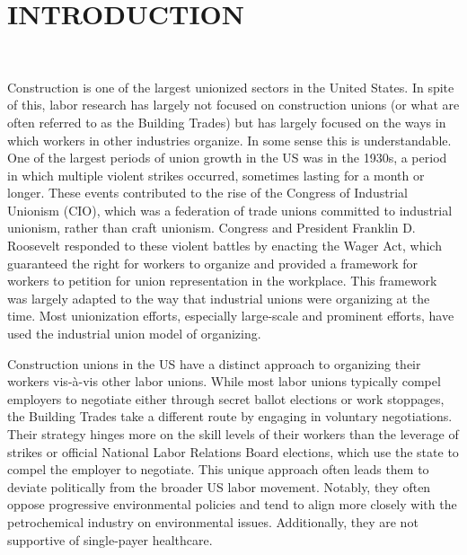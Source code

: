 \documentclass[12pt]{article}
\begin{document}
\tableofcontents
\newpage


\section{INTRODUCTION} \

Construction is one of the largest unionized sectors in the United States. In spite of this, labor research has largely not focused on construction unions (or what are often referred to as the Building Trades) but has largely focused on the ways in which workers in other industries organize. In some sense this is understandable. One of the largest periods of union growth in the US was in the 1930s, a period in which multiple violent strikes occurred, sometimes lasting for a month or longer. These events contributed to the rise of the Congress of Industrial Unionism (CIO), which was a federation of trade unions committed to industrial unionism, rather than craft unionism. Congress and President Franklin D. Roosevelt responded to these violent battles by enacting the Wager Act, which guaranteed the right for workers to organize and provided a framework for workers to petition for union representation in the workplace. This framework was largely adapted to the way that industrial unions were organizing at the time. Most unionization efforts, especially large-scale and prominent efforts, have used the industrial union model of organizing.


Construction unions in the US have a distinct approach to organizing their workers vis-à-vis other labor unions. While most labor unions typically compel employers to negotiate either through secret ballot elections or work stoppages, the Building Trades take a different route by engaging in voluntary negotiations. Their strategy hinges more on the skill levels of their workers than the leverage of strikes or official National Labor Relations Board elections, which use the state to compel the employer to negotiate. This unique approach often leads them to deviate politically from the broader US labor movement. Notably, they often oppose progressive environmental policies and tend to align more closely with the petrochemical industry on environmental issues. Additionally, they are not supportive of single-payer healthcare.
\end{document}
